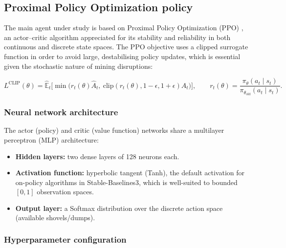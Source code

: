 \documentclass[11pt,a4paper]{article}
\begin{document}
\subsection{Proximal Policy Optimization policy}

The main agent under study is based on Proximal Policy Optimization (PPO) \cite{JohnSchulman2017}, an actor--critic algorithm appreciated for its stability and reliability in both continuous and discrete state spaces. The PPO objective uses a clipped surrogate function in order to avoid large, destabilising policy updates, which is essential given the stochastic nature of mining disruptions:

\begin{equation}
L^{\mathrm{CLIP}}(\theta) = \hat{\mathbb{E}}_t \Big[ \min \big( r_t(\theta)\hat{A}_t,\ \mathrm{clip}(r_t(\theta), 1-\epsilon, 1+\epsilon)\hat{A}_t \big) \Big],
\qquad r_t(\theta) = \frac{\pi_\theta(a_t \mid s_t)}{\pi_{\theta_{\mathrm{old}}}(a_t \mid s_t)} .
\end{equation}

\subsubsection{Neural network architecture}

The actor (policy) and critic (value function) networks share a multilayer perceptron (MLP) architecture:

\begin{itemize}
  \item \textbf{Hidden layers:} two dense layers of 128 neurons each.
  \item \textbf{Activation function:} hyperbolic tangent (Tanh), the default activation for on-policy algorithms in Stable-Baselines3, which is well-suited to bounded $[0,1]$ observation spaces.
  \item \textbf{Output layer:} a Softmax distribution over the discrete action space (available shovels/dumps).
\end{itemize}

\subsubsection{Hyperparameter configuration}
\end{document}
